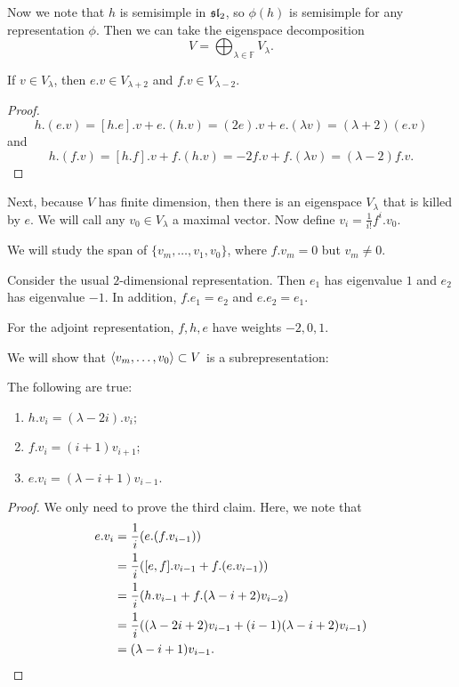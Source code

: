 \documentclass[twoside, 10pt]{article}
\newcommand{\F}{\mathbb{F}}
\begin{document}
    Now we note that $h$ is semisimple in $\mathfrak{sl}_2$, so $\phi(h)$ is
    semisimple for any representation $\phi$. Then we can take the eigenspace
    decomposition \[ V = \bigoplus_{\lambda \in \F} V_{\lambda}.\]

    \begin{lem} If $v \in V_{\lambda}$, then $e.v \in V_{\lambda + 2}$ and $f.v
    \in V_{\lambda - 2}$.  \end{lem}

    \begin{proof} \[ h.(e.v) = [h.e].v + e.(h.v) = (2e).v + e.(\lambda v) =
        (\lambda + 2)(e.v)\] and \[ h.(f.v) = [h.f].v + f.(h.v) = -2f.v +
    f.(\lambda v) = (\lambda -2) f.v.\] \end{proof}

    Next, because $V$ has finite dimension, then there is an eigenspace
    $V_{\lambda}$ that is killed by $e$. We will call any $v_0 \in V_{\lambda}$
    a maximal vector. Now define $v_i = \frac{1}{i!}f^i.v_0$.

    We will study the span of $\{v_m, \ldots, v_1, v_0\}$, where $f.v_m = 0$
    but $v_m \neq 0$.

    \begin{exm} Consider the usual $2$-dimensional representation. Then $e_1$
        has eigenvalue $1$ and $e_2$ has eigenvalue $-1$. In addition, $f.e_1 =
        e_2$ and $e.e_2 = e_1$.

        For the adjoint representation, $f,h,e$ have weights $-2,0,1$.
    \end{exm}

    We will show that $\langle v_m, \ldots, v_0\rangle \subset V$ is a
    subrepresentation:

    \begin{prop} The following are true: \begin{enumerate} \item $h.v_i =
    (\lambda - 2i).v_i$; \item $f.v_i = (i+1)v_{i+1}$; \item $e.v_i = (\lambda
    - i+1)v_{i-1}$.  \end{enumerate} \end{prop}

    \begin{proof} We only need to prove the third claim. Here, we note that
        \begin{align*} e.v_i &= \frac{1}{i}(e.(f.v_{i-1})) \\ &= \frac{1}{i}
            ([e,f].v_{i-1} + f.(e.v_{i-1}))\\ &= \frac{1}{i} (h.v_{i-1} +
            f.(\lambda-i+2)v_{i-2}) \\ &= \frac{1}{i} ((\lambda -2i+2) v_{i-1}
            + (i-1)(\lambda -i + 2) v_{i-1}) \\ &= (\lambda -i + 1) v_{i-1}.
        \qedhere \end{align*} \end{proof}
\end{document}
